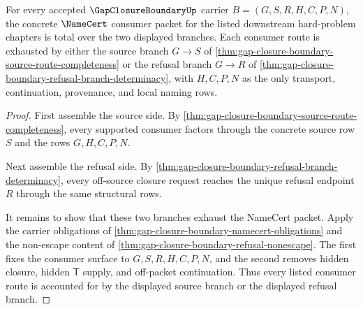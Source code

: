 \begin{theorem}
\label{thm:gap-closure-boundary-namecert-consumer-totality}
For every accepted $\GapClosureBoundaryUp$ carrier $B=(G,S,R,H,C,P,N)$, the concrete $\NameCert$ consumer packet for the listed downstream hard-problem chapters is total over the two displayed branches. Each consumer route is exhausted by either the source branch $G \longrightarrow S$ of \autoref{thm:gap-closure-boundary-source-route-completeness} or the refusal branch $G \longrightarrow R$ of \autoref{thm:gap-closure-boundary-refusal-branch-determinacy}, with $H,C,P,N$ as the only transport, continuation, provenance, and local naming rows.
\end{theorem}
\begin{proof}
First assemble the source side. By \autoref{thm:gap-closure-boundary-source-route-completeness}, every supported consumer factors through the concrete source row $S$ and the rows $G,H,C,P,N$.

Next assemble the refusal side. By \autoref{thm:gap-closure-boundary-refusal-branch-determinacy}, every off-source closure request reaches the unique refusal endpoint $R$ through the same structural rows.

It remains to show that these two branches exhaust the NameCert packet. Apply the carrier obligations of \autoref{thm:gap-closure-boundary-namecert-obligations} and the non-escape content of \autoref{thm:gap-closure-boundary-refusal-nonescape}. The first fixes the consumer surface to $G,S,R,H,C,P,N$, and the second removes hidden closure, hidden $\mathsf{T}$ supply, and off-packet continuation. Thus every listed consumer route is accounted for by the displayed source branch or the displayed refusal branch.
\end{proof}
